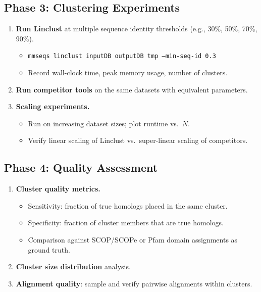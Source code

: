 \documentclass[11pt,a4paper]{article}
\begin{document}
\subsection{Phase 3: Clustering Experiments}
\begin{enumerate}[label=\textbf{3.\arabic*}]
  \item \textbf{Run Linclust} at multiple sequence identity thresholds (e.g., 30\%, 50\%, 70\%, 90\%).
    \begin{itemize}
      \item \texttt{mmseqs linclust inputDB outputDB tmp --min-seq-id 0.3}
      \item Record wall-clock time, peak memory usage, number of clusters.
    \end{itemize}
  \item \textbf{Run competitor tools} on the same datasets with equivalent parameters.
  \item \textbf{Scaling experiments.}
    \begin{itemize}
      \item Run on increasing dataset sizes; plot runtime vs.\ $N$.
      \item Verify linear scaling of Linclust vs.\ super-linear scaling of competitors.
    \end{itemize}
\end{enumerate}

\subsection{Phase 4: Quality Assessment}
\begin{enumerate}[label=\textbf{4.\arabic*}]
  \item \textbf{Cluster quality metrics.}
    \begin{itemize}
      \item Sensitivity: fraction of true homologs placed in the same cluster.
      \item Specificity: fraction of cluster members that are true homologs.
      \item Comparison against SCOP/SCOPe or Pfam domain assignments as ground truth.
    \end{itemize}
  \item \textbf{Cluster size distribution} analysis.
  \item \textbf{Alignment quality}: sample and verify pairwise alignments within clusters.
\end{enumerate}
\end{document}
